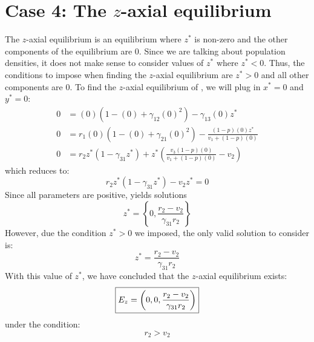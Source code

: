 \section{Case 4: The $z$-axial equilibrium}\label{sec:z_axial_equilibrium}
The $z$-axial equilibrium is an equilibrium where $z^*$ is non-zero and the other components of the equilibrium are 0. Since we are talking about population densities, it does not make sense to consider values of $z^*$ where $z^*<0$. Thus, the conditions to impose when finding the $z$-axial equilibrium are $z^*>0$ and all other components are 0. To find the $z$-axial equilibrium of , we will plug in $x^*=0$ and $y^*=0$:
\begin{align*}
    0 &= (0)\left(1-(0)+\gamma_{12}(0)^2\right)-\gamma_{13}(0)z^*\\
    0 &= r_1(0)\left(1-(0)+\gamma_{21}(0)^2\right)-\frac{\left(1-p\right)(0)z^*}{v_1+\left(1-p\right)(0)}\\
    0 &= r_2z^*\left(1-\gamma_{31}z^*\right)+z^*\left(\frac{v_3\left(1-p\right)(0)}{v_1+\left(1-p\right)(0)}-v_2\right)
\end{align*}
which reduces to:
\begin{equation}
    r_2z^*\left(1-\gamma_{31}z^*\right)-v_2z^*=0
    \label{eq:4.4}
\end{equation}
Since all parameters are positive,  yields solutions
\[
z^*=\left\{0, \frac{r_2-v_2}{\gamma_{31}r_2}\right\}
\]
However, due the condition $z^*>0$ we imposed, the only valid solution to consider is:
\[
z^*=\frac{r_2-v_2}{\gamma_{31}r_2}
\]
With this value of $z^*$, we have concluded that the $z$-axial equilibrium exists:
\[
\fbox{$\displaystyle E_z=\left(
0,
0,
\frac{r_2-v_2}{\gamma_{31}r_2}
\right)$}
\]
under the condition:
\[
r_2>v_2
\]


